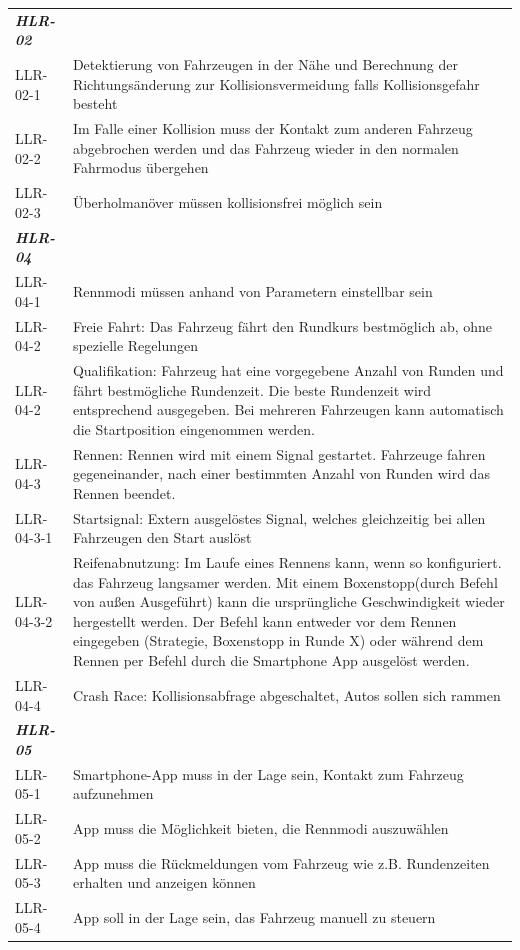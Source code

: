 \documentclass[a4paper,12pt]{article}                                         %
\numberwithin{table}{section}                               %
\numberwithin{figure}{section}                              %
\begin{document}
	\begin{tabular}{ l | p{} }
	\textbf{\textit{HLR-02}} & \\
	LLR-02-1 &
	Detektierung von Fahrzeugen in der Nähe und Berechnung der Richtungsänderung zur Kollisionsvermeidung falls Kollisionsgefahr besteht \\
	LLR-02-2 &
	Im Falle einer Kollision muss der Kontakt zum anderen Fahrzeug abgebrochen werden und das Fahrzeug wieder in den normalen Fahrmodus übergehen \\
	LLR-02-3 &
	Überholmanöver müssen kollisionsfrei möglich sein \\ \hline
	
	

	\textbf{\textit{HLR-04}} & \\
	LLR-04-1 &
	Rennmodi müssen anhand von Parametern einstellbar sein\\
	LLR-04-2 &
	Freie Fahrt: Das Fahrzeug fährt den Rundkurs bestmöglich ab, ohne spezielle Regelungen\\
	LLR-04-2 &
	Qualifikation: Fahrzeug hat eine vorgegebene Anzahl von Runden und fährt bestmögliche Rundenzeit. Die beste Rundenzeit wird entsprechend ausgegeben. Bei mehreren Fahrzeugen kann automatisch die Startposition eingenommen werden.\\
	LLR-04-3 &
	Rennen: Rennen wird mit einem Signal gestartet. Fahrzeuge fahren gegeneinander, nach einer bestimmten Anzahl von Runden wird das Rennen beendet. \\
	LLR-04-3-1 &
	Startsignal: Extern ausgelöstes Signal, welches gleichzeitig bei allen Fahrzeugen den Start auslöst \\
	LLR-04-3-2 &
	Reifenabnutzung: Im Laufe eines Rennens kann, wenn so konfiguriert. das Fahrzeug langsamer werden. Mit einem Boxenstopp(durch Befehl von außen Ausgeführt) kann die ursprüngliche Geschwindigkeit wieder hergestellt werden. Der Befehl kann entweder vor dem Rennen eingegeben (Strategie, Boxenstopp in Runde X) oder während dem Rennen per Befehl durch die Smartphone App ausgelöst werden. \\
	LLR-04-4 &
	Crash Race: Kollisionsabfrage abgeschaltet, Autos sollen sich rammen \\ \hline
	
	\textbf{\textit{HLR-05}} & \\
	LLR-05-1 &
	Smartphone-App muss in der Lage sein, Kontakt zum Fahrzeug aufzunehmen\\
	LLR-05-2 &
	App muss die Möglichkeit bieten, die Rennmodi auszuwählen\\
	LLR-05-3 &
	App muss die Rückmeldungen vom Fahrzeug wie z.B. Rundenzeiten erhalten und anzeigen können\\
	LLR-05-4 &
	App soll in der Lage sein, das Fahrzeug manuell zu steuern\\
	\hline
	\end{tabular}
	
\end{document}
